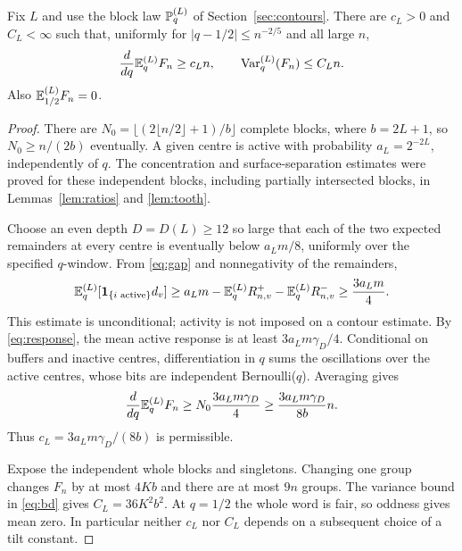\begin{lemma}\label{lem:blockdrift}
Fix $L$ and use the block law $\mathbb P_q^{(L)}$ of Section~\ref{sec:contours}. There are $c_L>0$ and $C_L<\infty$ such that, uniformly for $|q-1/2|\le n^{-2/5}$ and all large $n$,
\begin{equation}\label{eq:blockdrift}
 \frac d{dq}\mathbb E_q^{(L)}F_n\ge c_Ln,\qquad
 \operatorname{Var}_q^{(L)}(F_n)\le C_Ln.
\end{equation}
Also $\mathbb E_{1/2}^{(L)}F_n=0$.
\end{lemma}
\begin{proof}
There are $N_0=\lfloor(2\lfloor n/2\rfloor+1)/b\rfloor$ complete blocks, where $b=2L+1$, so $N_0\ge n/(2b)$ eventually. A given centre is active with probability $a_L=2^{-2L}$, independently of $q$. The concentration and surface-separation estimates were proved for these independent blocks, including partially intersected blocks, in Lemmas~\ref{lem:ratios} and \ref{lem:tooth}.

Choose an even depth $D=D(L)\ge12$ so large that each of the two expected remainders at every centre is eventually below $a_Lm/8$, uniformly over the specified $q$-window. From \eqref{eq:gap} and nonnegativity of the remainders,
\begin{equation}\label{eq:activegap}
 \mathbb E_q^{(L)}[\mathbf 1_{\{i\text{ active}\}}d_v]
 \ge a_Lm-\mathbb E_q^{(L)}R_{n,v}^+-\mathbb E_q^{(L)}R_{n,v}^-
 \ge\frac{3a_Lm}{4}.
\end{equation}
This estimate is unconditional; activity is not imposed on a contour estimate. By \eqref{eq:response}, the mean active response is at least $3a_Lm\gamma_D/4$. Conditional on buffers and inactive centres, differentiation in $q$ sums the oscillations over the active centres, whose bits are independent Bernoulli($q$). Averaging gives
\[
 \frac d{dq}\mathbb E_q^{(L)}F_n
 \ge N_0\frac{3a_Lm\gamma_D}{4}
 \ge\frac{3a_Lm\gamma_D}{8b}n.
\]
Thus $c_L=3a_Lm\gamma_D/(8b)$ is permissible.

Expose the independent whole blocks and singletons. Changing one group changes $F_n$ by at most $4Kb$ and there are at most $9n$ groups. The variance bound in \eqref{eq:bd} gives $C_L=36K^2b^2$. At $q=1/2$ the whole word is fair, so oddness gives mean zero. In particular neither $c_L$ nor $C_L$ depends on a subsequent choice of a tilt constant.
\end{proof}

